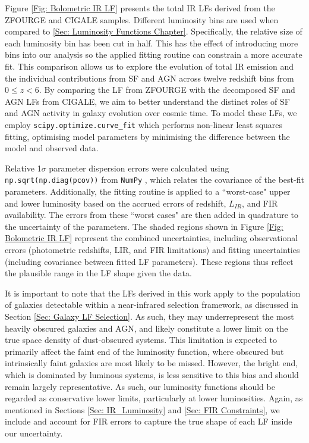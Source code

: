 Figure \ref{Fig: Bolometric IR LF} presents the total IR LFs derived from the ZFOURGE and CIGALE samples. Different luminosity bins are used when compared to \cref{Sec: Luminosity Functions Chapter}. Specifically, the relative size of each luminosity bin has been cut in half. This has the effect of introducing more bins into our analysis so the applied fitting routine can constrain a more accurate fit. This comparison allows us to explore the evolution of total IR emission and the individual contributions from SF and AGN across twelve redshift bins from $0 \leq z < 6$. By comparing the LF from ZFOURGE with the decomposed SF and AGN LFs from CIGALE, we aim to better understand the distinct roles of SF and AGN activity in galaxy evolution over cosmic time. To model these LFs, we employ \texttt{scipy.optimize.curve\_fit} \citep{virtanen_scipy_2020} which performs non-linear least squares fitting, optimising model parameters by minimising the difference between the model and observed data. 

Relative 1$\sigma$ parameter dispersion errors were calculated using \texttt{np.sqrt(np.diag(pcov))} from \texttt{NumPy} \citep{harris_array_2020}, which relates the covariance of the best-fit parameters. Additionally, the fitting routine is applied to a ``worst-case" upper and lower luminosity based on the accrued errors of redshift, $L_{IR}$, and FIR availability. The errors from these ``worst cases" are then added in quadrature to the uncertainty of the parameters. The shaded regions shown in Figure \ref{Fig: Bolometric IR LF} represent the combined uncertainties, including observational errors (photometric redshifts, LIR, and FIR limitations) and fitting uncertainties (including covariance between fitted LF parameters). These regions thus reflect the plausible range in the LF shape given the data.

It is important to note that the LFs derived in this work apply to the population of galaxies detectable within a near-infrared selection framework, as discussed in Section \ref{Sec: Galaxy LF Selection}. As such, they may underrepresent the most heavily obscured galaxies and AGN, and likely constitute a lower limit on the true space density of dust-obscured systems. This limitation is expected to primarily affect the faint end of the luminosity function, where obscured but intrinsically faint galaxies are most likely to be missed. However, the bright end, which is dominated by luminous systems, is less sensitive to this bias and should remain largely representative. As such, our luminosity functions should be regarded as conservative lower limits, particularly at lower luminosities. Again, as mentioned in Sections \ref{Sec: IR_Luminosity} and \ref{Sec: FIR Constraints}, we include and account for FIR errors to capture the true shape of each LF inside our uncertainty.

